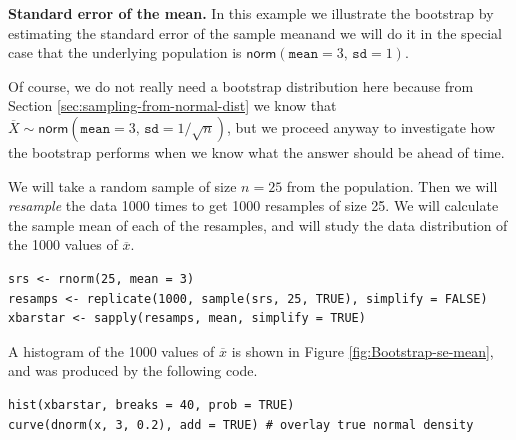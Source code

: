 \documentclass[captions=tableheading]{scrbook}
\begin{document}
\begin{example}
\label{exa:Bootstrap-se-mean}

\textbf{Standard error of the mean.}  In this example we illustrate the bootstrap by estimating the standard error of the sample meanand we will do it in the special case that the underlying population is \(\mathsf{norm}(\mathtt{mean}=3,\,\mathtt{sd}=1)\).  

Of course, we do not really need a bootstrap distribution here because from Section \ref{sec:sampling-from-normal-dist} we know that \(\overline{X}\sim\mathsf{norm}(\mathtt{mean}=3,\,\mathtt{sd}=1/\sqrt{n})\), but we proceed anyway to investigate how the bootstrap performs when we know what the answer should be ahead of time.

We will take a random sample of size \(n=25\) from the population. Then we will \emph{resample} the data 1000 times to get 1000 resamples of size 25. We will calculate the sample mean of each of the resamples, and will study the data distribution of the 1000 values of \(\overline{x}\).


\begin{verbatim}
srs <- rnorm(25, mean = 3)
resamps <- replicate(1000, sample(srs, 25, TRUE), simplify = FALSE)
xbarstar <- sapply(resamps, mean, simplify = TRUE)
\end{verbatim}

A histogram of the 1000 values of \(\overline{x}\) is shown in Figure \ref{fig:Bootstrap-se-mean}, and was produced by the following code.


\begin{verbatim}
hist(xbarstar, breaks = 40, prob = TRUE)
curve(dnorm(x, 3, 0.2), add = TRUE) # overlay true normal density
\end{verbatim}






\end{example}
\end{document}
